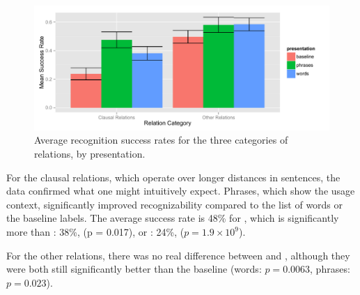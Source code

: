 \begin{figure}
\includegraphics[width=1.0\columnwidth]{fig/by-relation-type}
\caption{
	\label{fig:results-by-relation-type} Average recognition success rates for the three categories of relations, by presentation.
}
\end{figure}


For the clausal relations, which operate over longer distances in sentences, the data confirmed what one might intuitively expect. Phrases, which show the usage context, significantly improved recognizability compared to the list of words or the baseline labels. The average success rate is 48\% for , which is significantly more than : 38\%, (p = 0.017), or : 24\%, ($p= 1.9 \times 10^9$).

For the other relations, there was no real difference between  and , although they were both still significantly better than the baseline (words: $p=0.0063$, phrases: $p=0.023$).
